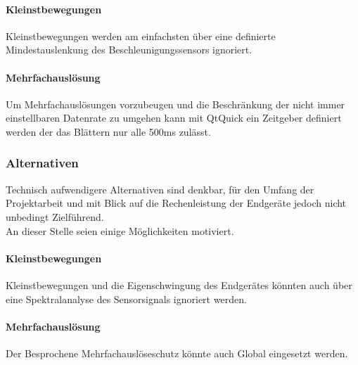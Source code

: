 \paragraph{Kleinstbewegungen}$\;$\\
Kleinstbewegungen werden am einfachsten über eine definierte Mindestauslenkung des Beschleunigungssensors ignoriert.
\paragraph{Mehrfachauslösung}$\;$\\
Um Mehrfachauslösungen vorzubeugen und die Beschränkung der nicht immer einstellbaren Datenrate zu umgehen kann mit QtQuick ein Zeitgeber definiert werden der das Blättern nur alle 500ms zulässt.
\subsubsection{Alternativen}
\label{BeschleunigungssensorAlternativen}
Technisch aufwendigere Alternativen sind denkbar, für den Umfang der Projektarbeit und mit Blick auf die Rechenleistung der Endgeräte jedoch nicht unbedingt Zielführend.\\
An dieser Stelle seien einige Möglichkeiten motiviert.
\paragraph{Kleinstbewegungen}$\;$\\
Kleinstbewegungen und die Eigenschwingung des Endgerätes könnten auch über eine Spektralanalyse des Sensorsignals ignoriert werden.
\paragraph{Mehrfachauslösung}$\;$\\
Der Besprochene Mehrfachauslöseschutz könnte auch Global eingesetzt werden.